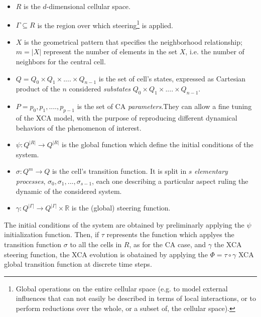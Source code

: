     \begin{itemize}

    \item $R$ is the $d$-dimensional cellular space.

    \item $\Gamma \subseteq R$ is the region over which steering\footnote{Global operations on the entire cellular space (e.g. to model external
      influences that can not easily be described in terms of local
      interactions, or to perform reductions over the whole, or a subset
      of, the cellular space).}  is applied.

    \item $X$ is the geometrical pattern that specifies the neighborhood
      relationship; $m = |X|$ represent the number of elements in the set
      $X$, i.e. the number of neighbors for the central cell.

    \item $Q = Q_0 \times Q_1 \times....\times Q_{n-1}$ is the set of
      cell's states, expressed as Cartesian product of the $n$ considered
      \emph{substates} $Q_0 \times Q_1 \times....\times Q_{n-1}$.

    \item $P = {p_0,p_1,....,p_{p-1}}$ is the set of CA
      \emph{parameters}.They can allow a fine tuning of the XCA model,
      with the purpose of reproducing different dynamical behaviors of
      the phenomenon of interest.

    \item $\psi : Q^{|R|} \rightarrow Q^{|R|}$ is the global function
      which define the initial conditions of the system.
      
    \item $\sigma : Q^m \rightarrow Q$ is the cell's transition function.
      It is split in $s$ \emph{elementary processes}, $\sigma_0,\sigma_1,
      ..., \sigma_{s-1}$, each one describing a particular aspect ruling
      the dynamic of the considered system.

    \item $\gamma: Q^{|\Gamma|} \rightarrow Q^{|\Gamma|} \times
      \mathbb{R}$ is the (global) steering function.

    \end{itemize}

    The initial conditions of the system are obtained by preliminarly
    applying the $\psi$ initialization function. Then, if $\tau$
    represents the function which applyes the transition function
    $\sigma$ to all the cells in $R$, as for the CA case, and $\gamma$
    the XCA steering function, the XCA evolution is obatained by
    applying the $\Phi = \tau \circ \gamma$ XCA global transition
    function at discrete time steps.
